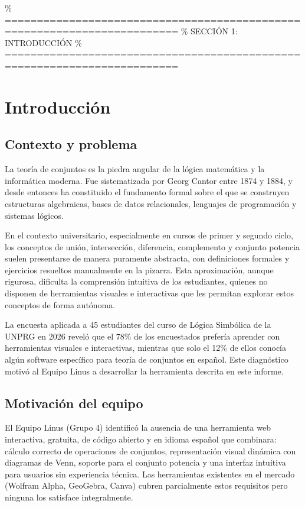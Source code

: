\documentclass[11pt,a4paper]{article}
\begin{document}
\newpage

\% =========================================================================
\% SECCIÓN 1: INTRODUCCIÓN
\% =========================================================================
\section{Introducción}

\subsection{Contexto y problema}
La teoría de conjuntos es la piedra angular de la lógica matemática y la informática moderna. Fue sistematizada por Georg Cantor entre 1874 y 1884, y desde entonces ha constituido el fundamento formal sobre el que se construyen estructuras algebraicas, bases de datos relacionales, lenguajes de programación y sistemas lógicos.

En el contexto universitario, especialmente en cursos de primer y segundo ciclo, los conceptos de unión, intersección, diferencia, complemento y conjunto potencia suelen presentarse de manera puramente abstracta, con definiciones formales y ejercicios resueltos manualmente en la pizarra. Esta aproximación, aunque rigurosa, dificulta la comprensión intuitiva de los estudiantes, quienes no disponen de herramientas visuales e interactivas que les permitan explorar estos conceptos de forma autónoma.

La encuesta aplicada a 45 estudiantes del curso de Lógica Simbólica de la UNPRG en 2026 reveló que el 78\% de los encuestados prefería aprender con herramientas visuales e interactivas, mientras que solo el 12\% de ellos conocía algún software específico para teoría de conjuntos en español. Este diagnóstico motivó al Equipo Linus a desarrollar la herramienta descrita en este informe.

\subsection{Motivación del equipo}
El Equipo Linus (Grupo 4) identificó la ausencia de una herramienta web interactiva, gratuita, de código abierto y en idioma español que combinara: cálculo correcto de operaciones de conjuntos, representación visual dinámica con diagramas de Venn, soporte para el conjunto potencia y una interfaz intuitiva para usuarios sin experiencia técnica. Las herramientas existentes en el mercado (Wolfram Alpha, GeoGebra, Canva) cubren parcialmente estos requisitos pero ninguna los satisface integralmente.
\end{document}
